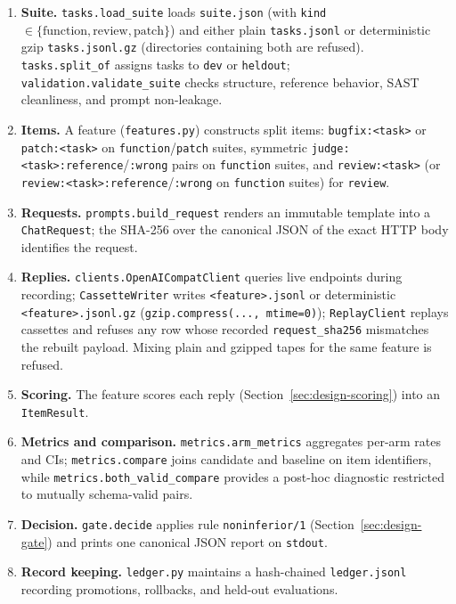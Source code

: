 \documentclass[conference]{IEEEtran}
\begin{document}
\begin{enumerate}
\item \textbf{Suite.} \texttt{tasks.\allowbreak{}load\_\allowbreak{}suite} loads \texttt{suite.\allowbreak{}json} (with \texttt{kind} $\in \{\text{function}, \text{review}, \text{patch}\}$) and either plain \texttt{tasks.\allowbreak{}jsonl} or deterministic gzip \texttt{tasks.\allowbreak{}jsonl.\allowbreak{}gz} (directories containing both are refused). \texttt{tasks.\allowbreak{}split\_\allowbreak{}of} assigns tasks to \texttt{dev} or \texttt{heldout}; \texttt{validation.\allowbreak{}validate\_\allowbreak{}suite} checks structure, reference behavior, SAST cleanliness, and prompt non-leakage.
\item \textbf{Items.} A feature (\texttt{features.\allowbreak{}py}) constructs split items: \texttt{bugfix:\allowbreak{}<task>} or \texttt{patch:\allowbreak{}<task>} on \texttt{function}/\texttt{patch} suites, symmetric \texttt{judge:\allowbreak{}<task>:\allowbreak{}reference}/\texttt{:wrong} pairs on \texttt{function} suites, and \texttt{review:\allowbreak{}<task>} (or \texttt{review:\allowbreak{}<task>:\allowbreak{}reference}/\allowbreak{}\texttt{:wrong} on \texttt{function} suites) for \texttt{review}.
\item \textbf{Requests.} \texttt{prompts.\allowbreak{}build\_\allowbreak{}request} renders an immutable template into a \texttt{ChatRequest}; the SHA-256 over the canonical JSON of the exact HTTP body identifies the request.
\item \textbf{Replies.} \texttt{clients.\allowbreak{}OpenAICompatClient} queries live endpoints during recording; \texttt{CassetteWriter} writes \texttt{<feature>.\allowbreak{}jsonl} or deterministic \texttt{<feature>.\allowbreak{}jsonl.\allowbreak{}gz} (\texttt{gzip.\allowbreak{}compress(..., mtime=0)}); \texttt{ReplayClient} replays cassettes and refuses any row whose recorded \texttt{request\_\allowbreak{}sha256} mismatches the rebuilt payload. Mixing plain and gzipped tapes for the same feature is refused.
\item \textbf{Scoring.} The feature scores each reply (Section~\ref{sec:design-scoring}) into an \texttt{ItemResult}.
\item \textbf{Metrics and comparison.} \texttt{metrics.\allowbreak{}arm\_\allowbreak{}metrics} aggregates per-arm rates and CIs; \texttt{metrics.\allowbreak{}compare} joins candidate and baseline on item identifiers, while \texttt{metrics.\allowbreak{}both\_\allowbreak{}valid\_\allowbreak{}compare} provides a post-hoc diagnostic restricted to mutually schema-valid pairs.
\item \textbf{Decision.} \texttt{gate.\allowbreak{}decide} applies rule \texttt{noninferior/\allowbreak{}1} (Section~\ref{sec:design-gate}) and prints one canonical JSON report on \texttt{stdout}.
\item \textbf{Record keeping.} \texttt{ledger.\allowbreak{}py} maintains a hash-chained \texttt{ledger.\allowbreak{}jsonl} recording promotions, rollbacks, and held-out evaluations.
\end{enumerate}
\end{document}
